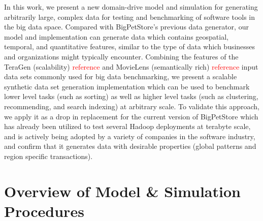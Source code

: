 \documentclass[conference]{IEEEtran}
\begin{document}
In this work, we present a new domain-drive model and simulation for generating arbitrarily large, complex data for testing and benchmarking of software tools in the big data space. Compared with BigPetStore's previous data generator, our model and implementation can generate data which contains geospatial, temporal, and quantitative features, similar to the type of data which businesses and organizations might typically encounter. Combining the features of the TeraGen (scalability) \textcolor{red}{reference} and MovieLens (semantically rich) \textcolor{red}{reference} input data sets commonly used for big data benchmarking, we present a scalable synthetic data set generation implementation which can be used to benchmark lower level tasks (such as sorting) as well as higher level tasks (such as clustering, recommending, and search indexing) at arbitrary scale.  To validate this approach, we apply it as a drop in replacement for the current version of BigPetStore which has already been utilized to test several Hadoop deployments at terabyte scale, and is actively being adopted by a variety of companies in the software industry, and confirm that it generates data with desirable properties (global patterns and region specific transactions).



\section{Overview of Model \& Simulation Procedures}
\end{document}

